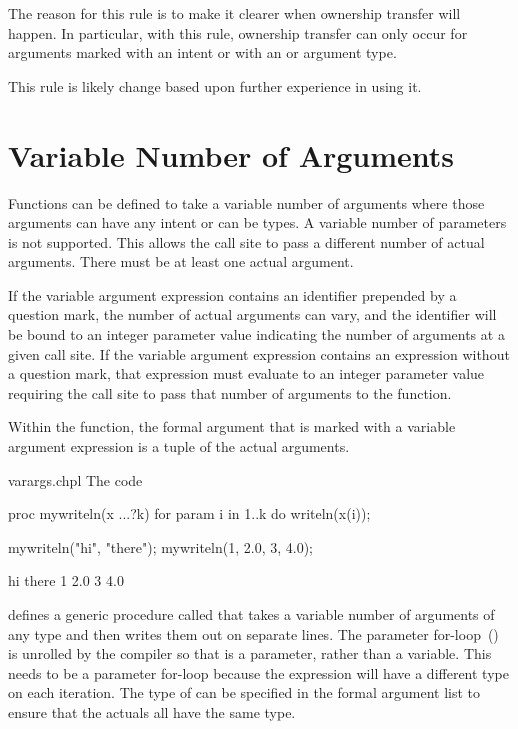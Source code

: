 \begin{openissue}
The reason for this rule is to make it clearer when ownership transfer will
happen. In particular, with this rule, ownership transfer can only occur
for arguments marked with an  intent or with an  or
 argument type.

This rule is likely change based upon further experience in using it.
\end{openissue}


\section{Variable Number of Arguments}
\label{Variable_Length_Argument_Lists}

Functions can be defined to take a variable number of arguments where
those arguments can have any intent or can be types.  A variable
number of parameters is not supported.  This allows the call site to
pass a different number of actual arguments.  There must be at least
one actual argument.

If the variable argument expression contains an identifier prepended by a
question mark, the number of actual arguments can vary, and the identifier
will be bound to an integer parameter value indicating the number of
arguments at a given call site.
If the variable argument expression contains an expression without
a question mark, that expression must evaluate to an integer parameter value
requiring the call site to pass that number of arguments to the
function.

Within the function, the formal argument that is marked with a
variable argument expression is a tuple of the actual
arguments.

\begin{chapelexample}{varargs.chpl}
The code
\begin{chapel}
proc mywriteln(x ...?k) {
  for param i in 1..k do
    writeln(x(i));
}
\end{chapel}
\begin{chapelpost}
mywriteln("hi", "there");
mywriteln(1, 2.0, 3, 4.0);
\end{chapelpost}
\begin{chapeloutput}
hi
there
1
2.0
3
4.0
\end{chapeloutput}
defines a generic procedure called  that takes a
variable number of arguments of any type and then writes them out on
separate lines.  The parameter for-loop~()
is unrolled by the compiler so that  is a parameter, rather
than a variable.  This needs to be a parameter for-loop because the
expression  will have a different type on each iteration.
The type of  can be specified in the formal argument list to
ensure that the actuals all have the same type.
\end{chapelexample}

